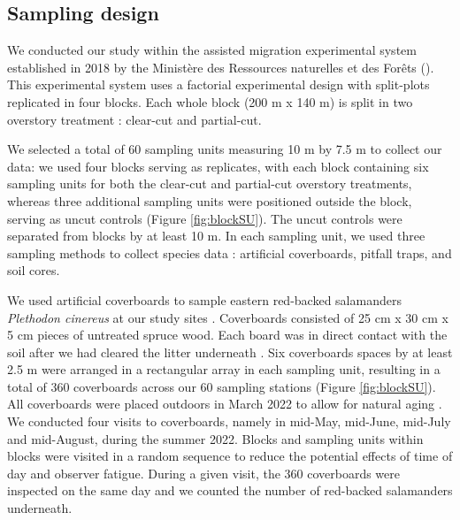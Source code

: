 \subsection*{Sampling design}
\label{subsec:sampling}

We conducted our study within the assisted migration experimental system established in 2018 by the Ministère des Ressources naturelles et des Forêts (\citealp{royoDesiredREgenerationAssisted2023}). 
This experimental system uses a factorial experimental design with split-plots replicated in four blocks. 
Each whole block (200 m x 140 m) is split in two overstory treatment : clear-cut and partial-cut. 

We selected a total of 60 sampling units measuring 10 m by 7.5 m to collect our data: we used four blocks serving as replicates, 
with each block containing six sampling units for both the clear-cut and partial-cut overstory treatments, 
whereas three additional sampling units were positioned outside the block, serving as uncut controls (Figure \ref*{fig:blockSU}). 
The uncut controls were separated from blocks by at least 10 m. 
In each sampling unit, we used three sampling methods to collect species data : artificial coverboards, pitfall traps, and soil cores.

We used artificial coverboards to sample eastern red-backed salamanders \textit{Plethodon cinereus} at our study sites \citep{hydeSamplingPlethodontidSalamanders2001,mooreComparisonPopulationEastern2009c,hesedUncoveringSalamanderEcology2012,Mazerolle2021Woodlandsalamander}. 
Coverboards consisted of 25 cm x 30 cm x 5 cm pieces of untreated spruce wood. Each board was in direct contact with the soil after we had cleared the litter underneath \citep{Mazerolle2021Woodlandsalamander}. 
Six coverboards spaces by at least 2.5 m were arranged in a rectangular array in each sampling unit, resulting in a total of 360 coverboards across our 60 sampling stations (Figure \ref{fig:blockSU}). 
All coverboards were placed outdoors in March 2022 to allow for natural aging \citep{hedrickEffectsCoverboardAge2021,Grasser2014Effectscover}. 
We conducted four visits to coverboards, namely in mid-May, mid-June, mid-July and mid-August, during the summer 2022. 
Blocks and sampling units within blocks  were visited in a random sequence to reduce the potential effects of time of day and observer fatigue. 
During a given visit, the 360 coverboards were inspected on the same day and we counted the number of red-backed salamanders underneath.  

